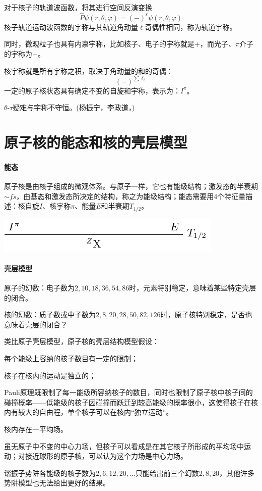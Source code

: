 对于核子的轨道波函数，将其进行空间反演变换
\[
	\hat P\psi(r,\theta,\varphi)=(-)^\ell\psi(r,\theta,\varphi)
\]
核子轨道运动波函数的宇称与其轨道角动量$\ell$奇偶性相同，称为轨道宇称。

同时，微观粒子也具有内禀宇称，比如核子、电子的宇称就是$+$，而光子、$\pi$介子的宇称为$-$。

核宇称就是所有宇称之积，取决于角动量的和的奇偶：
\[
	(-)^{\sum\ell_i}
\]
一定的原子核状态具有确定不变的自旋和宇称，表示为：$I^\pi$。

$\theta$-$\tau$疑难与宇称不守恒。(杨振宁，李政道，)

\section{原子核的能态和核的壳层模型}

\paragraph{能态}原子核是由核子组成的微观体系。与原子一样，它也有能级结构；激发态的半衰期$\sim\si{fs}$，由基态和激发态所决定的结构，称之为能级结构；能态需要用4个特征量描述：核自旋$I$、核宇称$\pi$、能量$E$和半衰期$T_{1/2}$。
\begin{center}
	\includegraphics[page=1]{figures/tikz/layouts.pdf}
\end{center}
\paragraph{壳层模型}原子的幻数：电子数为$2,10,18,36,54,86$时，元素特别稳定，意味着某些特定壳层的闭合。

核的幻数：质子数或中子数为$2,8,20,28,50,82,126$时，原子核特别稳定，是否也意味着壳层的闭合？

类比原子壳层模型，原子核的壳层结构模型假设：
\begin{compactenum}
	\item 每个能级上容纳的核子数目有一定的限制；
	\item 核子在核内的运动是独立的；

	Pauli原理既限制了每一能级所容纳核子的数目，同时也限制了原子核中核子间的碰撞概率——低能级的核子因碰撞而跃迁到较高能级的概率很小，这使得核子在核内有较大的自由程，单个核子可以在核内“独立运动”。
	\item 核内存在一平均场。

	虽无原子中不变的中心力场，但核子可以看成是在其它核子所形成的平均场中运动；对接近球形的原子核，可以认为这个力场是中心力场。
\end{compactenum}
谐振子势阱各能级的核子数为$2,6,12,20,\ldots$只能给出前三个幻数$2,8,20$，其他许多势阱模型也无法给出更好的结果。

